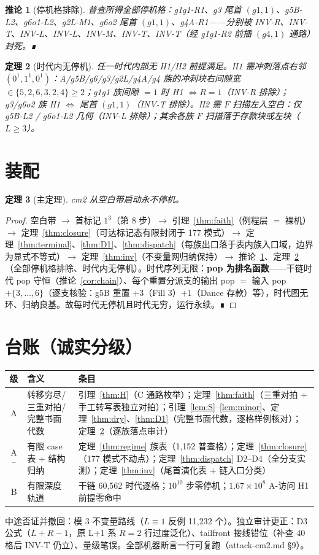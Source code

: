 \documentclass[11pt]{ctexart}
\newtheorem{theorem}{定理}[section]
\newtheorem{corollary}[theorem]{推论}
\theoremstyle{definition}
\begin{document}
\begin{corollary}[停机格排除]\label{cor:halt}
普查所得全部停机格：g1g1-R1、g3 尾首 $(g1,1)$、g5B-L2、g6o1-L2、g2L-M1、g6o2 尾首 $(g1,1)$、g4A-R1——分别被 INV-R、INV-T、INV-L、INV-L、INV-M、INV-T、INV-T（经 g1g1-R2 前插 $(g4,1)$ 通路）封死。∎
\end{corollary}

\begin{theorem}[时代内无停机]\label{thm:S}
任一时代内部无 H1/H2 前提满足。H1 需冲刺落点右邻 $(0^1,1^1,0^1)$：A/g5B/g6/g3/g2L/g4A/g4 族的冲刺块右间隙宽 $\in\{5,2,6,3,2,4\}\ge2$；g1g1 族间隙 $=1$ 时 H1 $\iff R{=}1$（INV-R 排除）；g3/g6o2 族 H1 $\iff$ 尾首 $(g1,1)$（INV-T 排除）。H2 需 $F$ 扫描左入空白：仅 g5B-L2 / g6o1-L2 几何（INV-L 排除）；其余各族 $F$ 扫描落于存款块或左块（$L\ge3$）。
\end{theorem}

\section{装配}

\begin{theorem}[主定理]\label{thm:main}
cm2 从空白带启动永不停机。
\end{theorem}
\begin{proof}
空白带 $\to$ 首标记 $1^3$（第 8 步）$\to$ 引理~\ref{thm:faith}（例程层 $=$ 裸机）$\to$ 定理~\ref{thm:closure}（可达标记态有限封闭于 177 模式）$\to$ 定理~\ref{thm:terminal}、\ref{thm:D1}、\ref{thm:dispatch}（每族出口落于表内族入口域，边界为显式不等式）$\to$ 定理~\ref{thm:inv}（不变量网归纳保持）$\to$ 推论~\ref{cor:halt}、定理~\ref{thm:S}（全部停机格排除、时代内无停机）。时代序列无限：\textbf{pop 为排名函数}——干链时代 pop 守恒（推论~\ref{cor:chain}）、每个重置分派支的输出 pop $=$ 输入 pop $+\{3,\dots,6\}$（逐支核验：g5B 重置 $+3$（Fill 3）$+1$（Dance 存款）等），时代图无环、归纳良基。故每时代无停机且时代无穷，运行永续。∎
\end{proof}

\section*{台账（诚实分级）}

\begin{center}\small
\begin{tabular}{clp{8.6cm}}
\toprule
级 & 含义 & 条目\\
\midrule
A & 转移穷尽/三重对拍/完整书面代数 & 引理~\ref{thm:H}（C 通路枚举）；定理~\ref{thm:faith}（三重对拍 + 手工转写表独立对拍）；引理~\ref{lem:S}--\ref{lem:minor}、定理~\ref{thm:dry}、\ref{thm:D1}（完整书面代数，逐格样例核对）；定理~\ref{thm:S}（逐族落点审计）\\
A$^-$ & 有限 case 表 + 结构归纳 & 定理~\ref{thm:regime} 族表（1{,}152 普查格）；定理~\ref{thm:closure}（177 模式不动点）；定理~\ref{thm:dispatch} D2--D4（全分支实测）；定理~\ref{thm:inv}（尾首演化表 + 链入口分类）\\
B & 有限深度轨道 & 干链 60{,}562 时代逐格；$10^{10}$ 步零停机；$1.67\times10^8$ A-访问 H1 前提零命中\\
\bottomrule
\end{tabular}
\end{center}

\noindent 中途否证并撤回：模 3 不变量路线（$L\equiv1$ 反例 11{,}232 个）。独立审计更正：D3 公式（$L{+}R{-}1$，原 L+1 系 $R{=}2$ 行过度泛化）、tailfront 接线错位（补查 40 格后 INV-T 仍立）、量级笔误。全部机器断言一行可复跑（attack-cm2.md \S9）。
\end{document}

